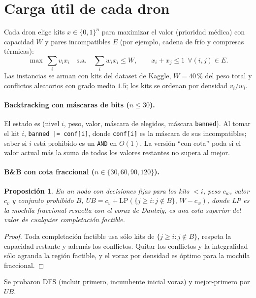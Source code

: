 \documentclass[11pt]{article}
\newtheorem{prop}{Proposición}
\theoremstyle{remark}
\begin{document}
\section{Carga útil de cada dron}

Cada dron elige kits $x\in\{0,1\}^n$ para maximizar el valor (prioridad médica) con capacidad $W$ y
pares incompatibles $E$ (por ejemplo, cadena de frío y compresas térmicas):
\[
\max\ \textstyle\sum_i v_ix_i\quad\text{s.a.}\quad\sum_iw_ix_i\le W,\qquad x_i+x_j\le1\ \ \forall(i,j)\in E.
\]
Las instancias se arman con kits del dataset de Kaggle, $W=40\,\%$ del peso total y conflictos
aleatorios con grado medio $1.5$; los kits se ordenan por densidad $v_i/w_i$.

\paragraph{Backtracking con máscaras de bits ($n\le30$).} El estado es (nivel $i$, peso, valor,
máscara de elegidos, máscara \texttt{banned}). Al tomar el kit $i$,
\texttt{banned |= conf[i]}, donde \texttt{conf[i]} es la máscara de sus incompatibles; saber si $i$
está prohibido es un \texttt{AND} en $O(1)$. La versión ``con cota'' poda si el valor actual más la
suma de todos los valores restantes no supera al mejor.

\paragraph{B\&B con cota fraccional ($n\in\{30,60,90,120\}$).}
\begin{prop}
En un nodo con decisiones fijas para los kits $<i$, peso $c_w$, valor $c_v$ y conjunto prohibido $B$,
$UB=c_v+\mathrm{LP}(\{j\ge i: j\notin B\},\,W-c_w)$, donde LP es la mochila fraccional resuelta con el
voraz de Dantzig, es una cota superior del valor de cualquier completación factible.
\end{prop}
\begin{proof}
Toda completación factible usa sólo kits de $\{j\ge i:j\notin B\}$, respeta la capacidad restante y
además los conflictos. Quitar los conflictos y la integralidad sólo agranda la región factible, y el
voraz por densidad es óptimo para la mochila fraccional.
\end{proof}
Se probaron DFS (incluir primero, incumbente inicial voraz) y mejor-primero por $UB$.
\end{document}
